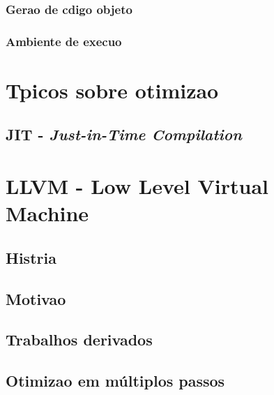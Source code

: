 \subsubsection{Gera\ca o de c\oh digo objeto}
\subsubsection{Ambiente de execu\ca o}

\section{T\oh picos sobre otimiza\ca o}
\subsection{JIT - \emph{Just-in-Time Compilation}}

\section{LLVM - Low Level Virtual Machine}
\subsection{Hist\oh ria}
\subsection{Motiva\ca o}
\subsection{Trabalhos derivados}
\subsection{Otimiza\ca o em m\'ultiplos passos}
